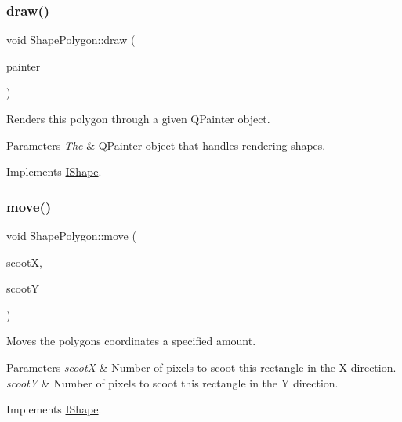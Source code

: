 \subsubsection{\texorpdfstring{draw()}{draw()}}
{\footnotesize\ttfamily void Shape\+Polygon\+::draw (\begin{DoxyParamCaption}\item[{Q\+Painter \&}]{painter }\end{DoxyParamCaption})\hspace{0.3cm}{\ttfamily [virtual]}}



Renders this polygon through a given Q\+Painter object. 


\begin{DoxyParams}{Parameters}
{\em The} & Q\+Painter object that handles rendering shapes. \\
\hline
\end{DoxyParams}


Implements \mbox{\hyperlink{class_i_shape_ad97c626e7e2c9afb9f51efc41b836e6f}{I\+Shape}}.

\mbox{\label{class_shape_polygon_a1f67f660d14090b21c00e2892f764451}} 
\subsubsection{\texorpdfstring{move()}{move()}}
{\footnotesize\ttfamily void Shape\+Polygon\+::move (\begin{DoxyParamCaption}\item[{int}]{scootX,  }\item[{int}]{scootY }\end{DoxyParamCaption})\hspace{0.3cm}{\ttfamily [virtual]}}



Moves the polygon\textquotesingle{}s coordinates a specified amount. 


\begin{DoxyParams}{Parameters}
{\em scootX} & Number of pixels to scoot this rectangle in the X direction. \\
\hline
{\em scootY} & Number of pixels to scoot this rectangle in the Y direction. \\
\hline
\end{DoxyParams}


Implements \mbox{\hyperlink{class_i_shape_a3d23494cd34e658cc6b39a2e2db0b7fe}{I\+Shape}}.

